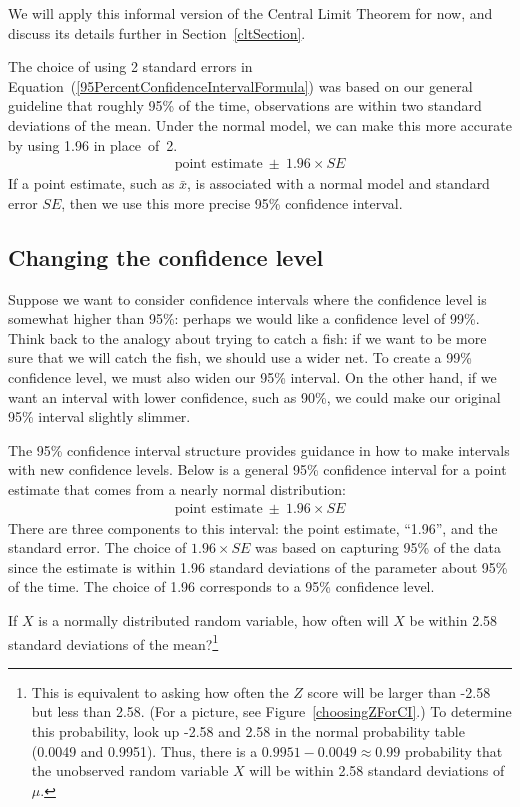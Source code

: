 We will apply this informal version of the Central Limit Theorem for now, and discuss its details further in Section~\ref{cltSection}.

The choice of using 2 standard errors in Equation~(\ref{95PercentConfidenceIntervalFormula}) was based on our general guideline that roughly 95\% of the time, observations are within two standard deviations of the mean. Under the normal model, we can make this more accurate by using 1.96 in place~of~2.
\begin{eqnarray}
\text{point estimate}\ \pm\ 1.96\times SE
\label{95PercentCIWhenUsingNormalModel}
\end{eqnarray}
If a point estimate, such as $\bar{x}$, is associated with a normal model and standard error $SE$, then we use this more precise 95\% confidence interval.


\subsection{Changing the confidence level}
\label{changingTheConfidenceLevelSection}


Suppose we want to consider confidence intervals where the confidence level is somewhat higher than 95\%: perhaps we would like a confidence level of 99\%. Think back to the analogy about trying to catch a fish: if we want to be more sure that we will catch the fish, we should use a wider net. To create a 99\% confidence level, we must also widen our 95\% interval. On the other hand, if we want an interval with lower confidence, such as 90\%, we could make our original 95\% interval slightly slimmer.

The 95\% confidence interval structure provides guidance in how to make intervals with new confidence levels. Below is a general 95\% confidence interval for a point estimate that comes from a nearly normal distribution:
\begin{eqnarray}
\text{point estimate}\ \pm\ 1.96\times SE
\end{eqnarray}
There are three components to this interval: the point estimate, ``1.96'', and the standard error. The choice of $1.96\times SE$ was based on capturing 95\% of the data since the estimate is within 1.96 standard deviations of the parameter about 95\% of the time. The choice of 1.96 corresponds to a 95\% confidence level. 

\begin{exercise} \label{leadInForMakingA99PercentCIExercise}
If $X$ is a normally distributed random variable, how often will $X$ be within 2.58 standard deviations of the mean?\footnote{This is equivalent to asking how often the $Z$ score will be larger than -2.58 but less than 2.58. (For a picture, see Figure~\ref{choosingZForCI}.) To determine this probability, look up -2.58 and 2.58 in the normal probability table (0.0049 and 0.9951). Thus, there is a $0.9951-0.0049 \approx 0.99$ probability that the unobserved random variable $X$ will be within 2.58 standard deviations of $\mu$.}
\end{exercise}

